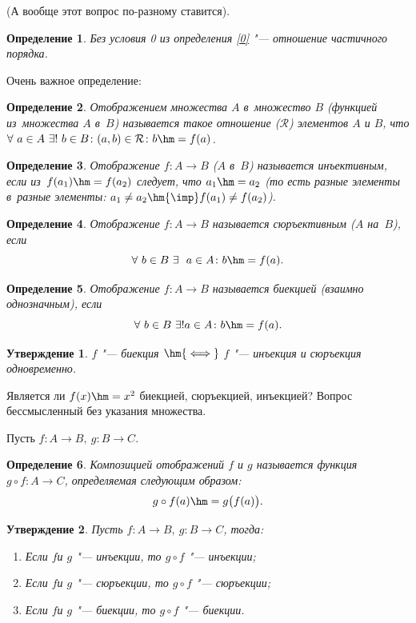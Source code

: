 \documentclass[a4paper,10pt,twoside]{article}
\newtheorem{Def}{Определение}[section]
\newtheorem{Ut}{Утверждение}[section]
\begin{document}
        (А вообще этот вопрос по-разному ставится).
\begin{Def}
    Без условия 0 из определения \ref{0} "--- отношение частичного порядка.
\end{Def}

Очень важное определение:

\begin{Def}\label{deffunc}
    Отображением множества $A$ в~множество $B$ (функцией из~множества $A$ в~$B$) называется такое отношение 
    ($\mathcal R$) элементов $A$ и $B$, что $\forall\  a\in A\ \exists!\ b\in B\colon(a,b)\in \mathcal R\colon b\hm=f(a)$.
\end{Def}

\begin{Def}
    Отображение $f\colon A\to B$ ($A$ в~$B$) называется инъективным, если из~$f(a_1)\hm=f(a_2)$ следует, что $a_1\hm=a_2$
    (то есть разные элементы в~разные элементы: $a_1\neq a_2\hm{\imp} f(a_1)\neq f(a_2)$).
\end{Def}

\begin{Def}
    Отображение $f\colon A\to B$ называется сюръективным ($A$ на~$B$), если 
    \[\forall\  b\in B\ \exists\ \ a\in A\colon b\hm=f(a).\]
\end{Def}

\begin{Def}
    Отображение $f\colon A\to B$ называется биекцией (взаимно однозначным), если
    \[
        \forall\  b\in B\ \exists!a\in A\colon b\hm=f(a).
    \]
\end{Def}

\begin{Ut}
    $f$ "--- биекция $\hm{\iff}$ $f$ "--- инъекция и сюръекция одновременно.
\end{Ut}

Является ли $f(x)\hm=x^2$ биекцией, сюръекцией, инъекцией? Вопрос бессмысленный без указания множества.

Пусть $f\colon A\to B,\ g\colon B\to C$.

\begin{Def}
    Композицией отображений $f$ и $g$ называется функция $g\circ f\colon A\to C$, определяемая следующим образом:
    \[
        g\circ f(a)\hm=g\big(f(a)\big).
    \]
\end{Def}

\begin{Ut}
    Пусть $f\colon A\to B,\ g\colon B\to C$, тогда:
    \begin{enumerate}
        \item Если $f$и $g$ "--- инъекции, то $g\circ f$ "--- инъекции;

        \item Если $f$и $g$ "--- сюръекции, то $g\circ f$ "--- сюръекции;

        \item Если $f$и $g$ "--- биекции, то $g\circ f$ "--- биекции.
    \end{enumerate}
\end{Ut}
\end{document}
